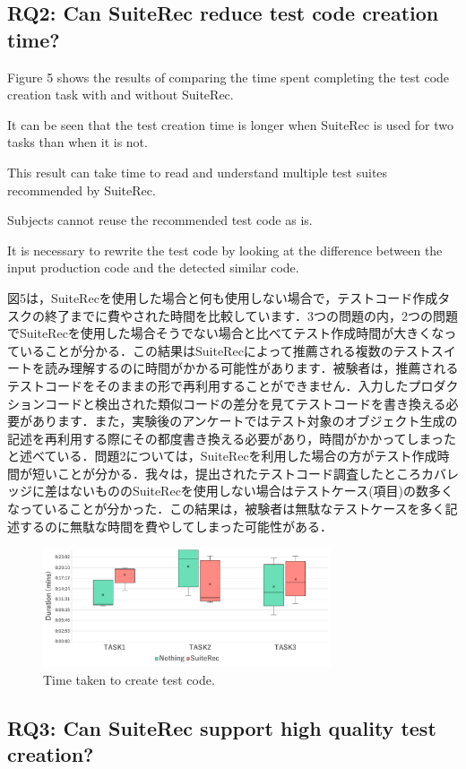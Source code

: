 \documentclass[conference]{IEEEtran}
\begin{document}
\subsection{RQ2: Can SuiteRec reduce test code creation time?}
Figure 5 shows the results of comparing the time spent completing the test code creation task with and without SuiteRec.

It can be seen that the test creation time is longer when SuiteRec is used for two tasks than when it is not.

This result can take time to read and understand multiple test suites recommended by SuiteRec.

Subjects cannot reuse the recommended test code as is.

It is necessary to rewrite the test code by looking at the difference between the input production code and the detected similar code.


図5は，SuiteRecを使用した場合と何も使用しない場合で，テストコード作成タスクの終了までに費やされた時間を比較しています．3つの問題の内，2つの問題でSuiteRecを使用した場合そうでない場合と比べてテスト作成時間が大きくなっていることが分かる．この結果はSuiteRecによって推薦される複数のテストスイートを読み理解するのに時間がかかる可能性があります．被験者は，推薦されるテストコードをそのままの形で再利用することができません．入力したプロダクションコードと検出された類似コードの差分を見てテストコードを書き換える必要があります．また，実験後のアンケートではテスト対象のオブジェクト生成の記述を再利用する際にその都度書き換える必要があり，時間がかかってしまったと述べている．問題2については，SuiteRecを利用した場合の方がテスト作成時間が短いことが分かる．我々は，提出されたテストコード調査したところカバレッジに差はないもののSuiteRecを使用しない場合はテストケース(項目)の数多くなっていることが分かった．この結果は，被験者は無駄なテストケースを多く記述するのに無駄な時間を費やしてしまった可能性がある．
\begin{figure}[htbp]
\centerline{\includegraphics[width=8.5cm]{duration.pdf}}
\caption{Time taken to create test code.}
\label{fig}
\end{figure}

\subsection{RQ3: Can SuiteRec support high quality test creation?}
\end{document}
